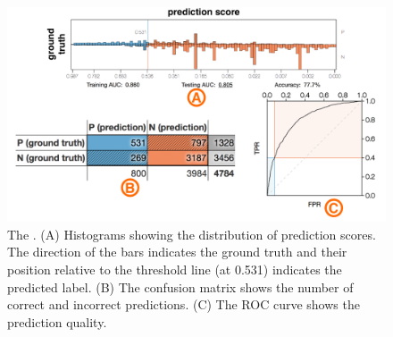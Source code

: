 \begin{figure}[t]
\centering
\includegraphics[width=\columnwidth]{explainer/overview_final}
\vspace{-8mm}
\caption{
The \textbf{\tabA}.
(A) Histograms showing the distribution of prediction scores.
The direction of the bars indicates the ground truth and their position relative to the threshold line (at 0.531) indicates the predicted label.
(B) The confusion matrix shows the number of correct and incorrect predictions. (C) The ROC curve shows the prediction quality.
}
\vspace{-5mm}
\label{figs:overview}
\end{figure}

